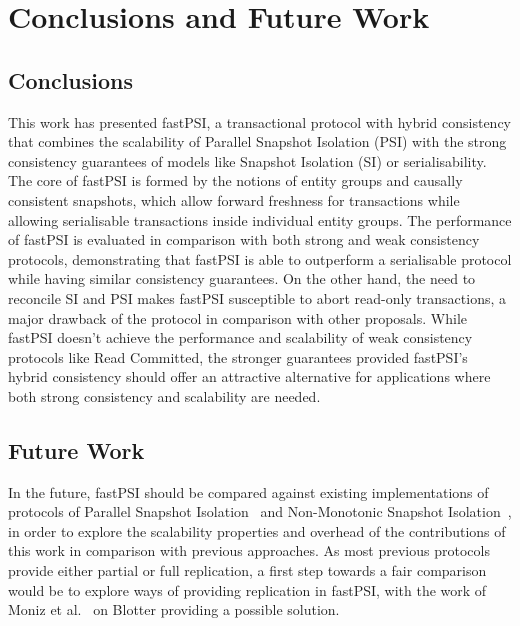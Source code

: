 \cleardoublepage
\chapter{Conclusions and Future Work}
\label{chapter:conclusion}

\section{Conclusions}

This work has presented fastPSI, a transactional protocol with hybrid consistency that combines the scalability of Parallel Snapshot Isolation (PSI) with the strong consistency guarantees of models like Snapshot Isolation (SI) or serialisability. The core of fastPSI is formed by the notions of entity groups and causally consistent snapshots, which allow forward freshness for transactions while allowing serialisable transactions inside individual entity groups. The performance of fastPSI is evaluated in comparison with both strong and weak consistency protocols, demonstrating that fastPSI is able to outperform a serialisable protocol while having similar consistency guarantees. On the other hand, the need to reconcile SI and PSI makes fastPSI susceptible to abort read-only transactions, a major drawback of the protocol in comparison with other proposals. While fastPSI doesn't achieve the performance and scalability of weak consistency protocols like Read Committed, the stronger guarantees provided fastPSI's hybrid consistency should offer an attractive alternative for applications where both strong consistency and scalability are needed.

\section{Future Work}

In the future, fastPSI should be compared against existing implementations of protocols of Parallel Snapshot Isolation~\citep{psi-intro} and Non-Monotonic Snapshot Isolation~\citep{ardekani_nmsi, moniz_blotter}, in order to explore the scalability properties and overhead of the contributions of this work in comparison with previous approaches. As most previous protocols provide either partial or full replication, a first step towards a fair comparison would be to explore ways of providing replication in fastPSI, with the work of Moniz et al.~\citep{moniz_blotter} on Blotter providing a possible solution.

